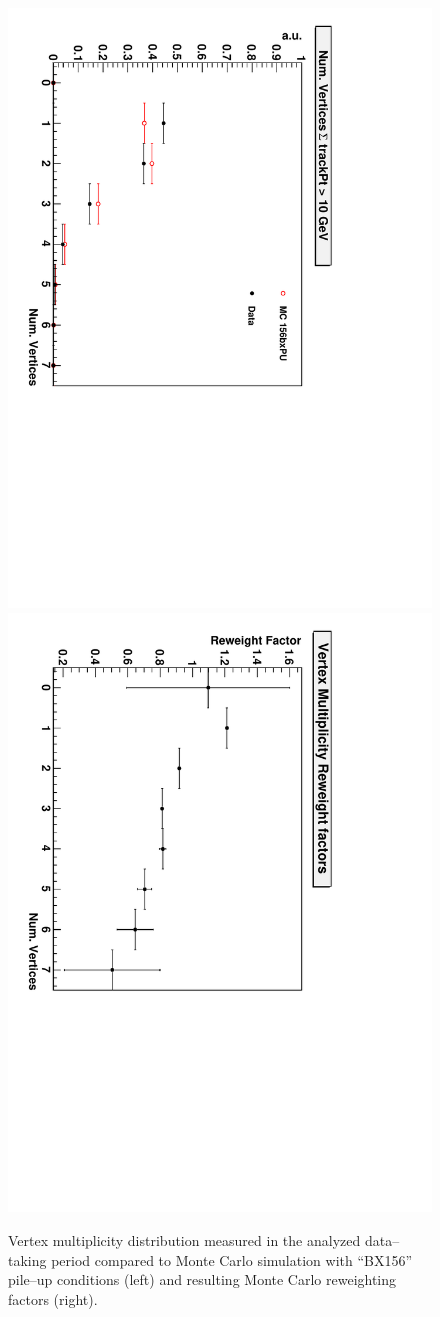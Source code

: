 \begin{figure}[t]
  \setlength{\unitlength}{1mm}
  \begin{center}
  \includegraphics*[height=0.49\textwidth, angle=90, viewport=0 27 408 565]{corrections_chapter/figures/vertexMultiplicity.pdf}
  \includegraphics*[height=0.49\textwidth, angle=90, viewport=0 27 408 565]{corrections_chapter/figures/vertexMultiplicityReweights.pdf}
    \caption[Distribution of number of reconstructed primary vertices per
    event]{\captiontext Vertex multiplicity distribution measured in the
    analyzed data--taking period compared to Monte Carlo simulation with
    ``BX156'' pile--up conditions (left) and resulting Monte Carlo reweighting
    factors (right).} \label{fig:pileUpReweighting}
  \end{center}
\end{figure} 
%
\ifx\master\undefined\fi
